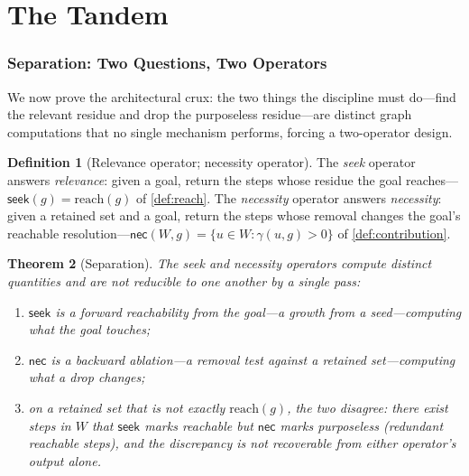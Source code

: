 \documentclass[11pt,twocolumn,a4paper]{article}
\theoremstyle{thmstyle}
\newtheorem{theorem}{Theorem}[section]
\theoremstyle{definition}
\newtheorem{definition}[theorem]{Definition}
\theoremstyle{remark}
\newcommand{\goal}{g}                   %
\newcommand{\reach}{\mathrm{reach}}
\newcommand{\contrib}{\gamma}           %
\newcommand{\seek}{\textsf{seek}}
\newcommand{\nec}{\textsf{nec}}
\newcommand{\set}[1]{\{#1\}}
\begin{document}
\part{The Tandem}

\section{Separation: Two Questions, Two Operators}
\label{sec:separation}

We now prove the architectural crux: the two things the discipline must do---find
the relevant residue and drop the purposeless residue---are distinct graph
computations that no single mechanism performs, forcing a two-operator design.

\begin{definition}[Relevance operator; necessity operator]
\label{def:operators}
The \emph{seek} operator answers \emph{relevance}: given a goal, return the steps
whose residue the goal reaches---$\seek(\goal)=\reach(\goal)$ of \cref{def:reach}.
The \emph{necessity} operator answers \emph{necessity}: given a retained set and a
goal, return the steps whose removal changes the goal's reachable
resolution---$\nec(W,\goal)=\set{u\in W:\contrib(u,\goal)>0}$ of
\cref{def:contribution}.
\end{definition}

\begin{theorem}[Separation]
\label{thm:separation}
The seek and necessity operators compute distinct quantities and are not
reducible to one another by a single pass:
\begin{enumerate}[label=\textup{(\roman*)},leftmargin=2.2em,itemsep=2pt]
\item $\seek$ is a \emph{forward} reachability from the goal---a growth from a
seed---computing what the goal \emph{touches};
\item $\nec$ is a \emph{backward} ablation---a removal test against a retained
set---computing what a drop \emph{changes};
\item on a retained set that is not exactly $\reach(\goal)$, the two disagree:
there exist steps in $W$ that $\seek$ marks reachable but $\nec$ marks
purposeless (redundant reachable steps), and the discrepancy is not recoverable
from either operator's output alone.
\end{enumerate}
\end{theorem}
\end{document}
